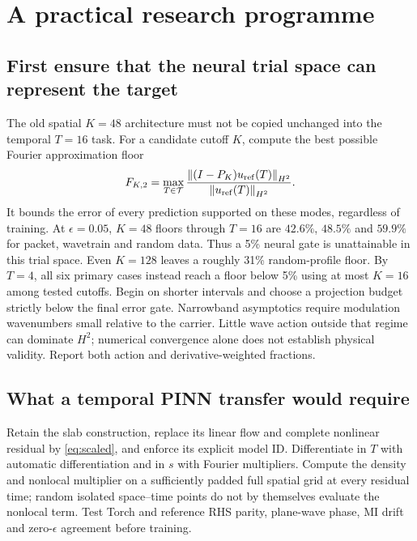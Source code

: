\section{A practical research programme}\label{sec:programme}
\subsection{First ensure that the neural trial space can represent the target}
The old spatial $K=48$ architecture must not be copied unchanged into the temporal $T=16$ task. For a candidate cutoff $K$, compute the best possible Fourier approximation floor
\begin{equation}
 F_{K,2}=\max_{T\in\mathcal T}
 \frac{\left\lVert (I-P_K)u_{\rm ref}(T)\right\rVert_{H^2}}{\left\lVert u_{\rm ref}(T)\right\rVert_{H^2}}.
 \label{eq:floor}
\end{equation}
It bounds the error of every prediction supported on these modes, regardless of training. At $\epsilon=0.05$, $K=48$ floors through $T=16$ are $42.6\%$, $48.5\%$ and $59.9\%$ for packet, wavetrain and random data. Thus a 5\% neural gate is unattainable in this trial space. Even $K=128$ leaves a roughly 31\% random-profile floor. By $T=4$, all six primary cases instead reach a floor below 5\% using at most $K=16$ among tested cutoffs. Begin on shorter intervals and choose a projection budget strictly below the final error gate.
Narrowband asymptotics require modulation wavenumbers small relative to the carrier. Little wave action outside that regime can dominate $H^2$; numerical convergence alone does not establish physical validity. Report both action and derivative-weighted fractions.

\subsection{What a temporal PINN transfer would require}
Retain the slab construction, replace its linear flow and complete nonlinear residual by \eqref{eq:scaled}, and enforce its explicit model ID. Differentiate in $T$ with automatic differentiation and in $s$ with Fourier multipliers. Compute the density and nonlocal multiplier on a sufficiently padded full spatial grid at every residual time; random isolated space--time points do not by themselves evaluate the nonlocal term. Test Torch and reference RHS parity, plane-wave phase, MI drift and zero-$\epsilon$ agreement before training.

